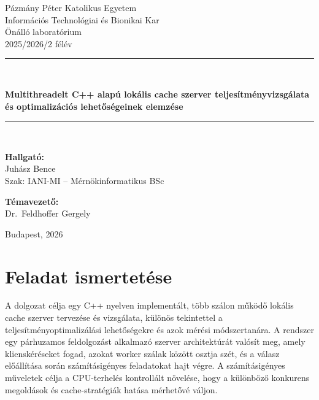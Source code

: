 \documentclass[11pt,a4paper]{article}
\newcommand{\dolgozatcim}{Multithreadelt C++ alapú lokális cache szerver teljesítményvizsgálata és optimalizációs lehetőségeinek elemzése}
\newcommand{\hallgatonev}{Juhász Bence}
\newcommand{\szakkod}{IANI-MI}
\newcommand{\szaknev}{Mérnökinformatikus BSc}
\newcommand{\temavezeto}{Dr.\ Feldhoffer Gergely}
\newcommand{\felev}{2025/2026/2}
\newcommand{\targynev}{Önálló laboratórium}
\begin{document}
\begin{titlepage}
    \centering
    \vspace*{1cm}

    {\Large Pázmány Péter Katolikus Egyetem\\
    Információs Technológiai és Bionikai Kar}\\[2.5cm]

    {\large \targynev}\\[0.5cm]
    {\large \felev{} félév}\\[2.5cm]

    \rule{\textwidth}{0.5pt}\\[0.6cm]
    {\LARGE\bfseries \dolgozatcim\par}
    \rule{\textwidth}{0.5pt}\\[2.5cm]

    \begin{minipage}{0.45\textwidth}
        \begin{flushleft}\large
            \textbf{Hallgató:}\\
            \hallgatonev\\
            Szak: \szakkod{} -- \szaknev
        \end{flushleft}
    \end{minipage}
    \hfill
    \begin{minipage}{0.45\textwidth}
        \begin{flushright}\large
            \textbf{Témavezető:}\\
            \temavezeto
        \end{flushright}
    \end{minipage}

    \vfill
    {\large Budapest, 2026}
\end{titlepage}

\tableofcontents

\section{Feladat ismertetése}
\label{sec:feladat}

A dolgozat célja egy C++ nyelven implementált, több szálon működő lokális 
cache szerver tervezése és vizsgálata, különös tekintettel a teljesítményoptimalizálási 
lehetőségekre és azok mérési módszertanára. A rendszer egy párhuzamos feldolgozást alkalmazó 
szerver architektúrát valósít meg, amely klienskéréseket fogad, azokat worker szálak között osztja 
szét, és a válasz előállítása során számításigényes feladatokat hajt végre. A számításigényes műveletek 
célja a CPU-terhelés kontrollált növelése, hogy a különböző konkurens megoldások és cache-stratégiák hatása mérhetővé váljon.
\end{document}
